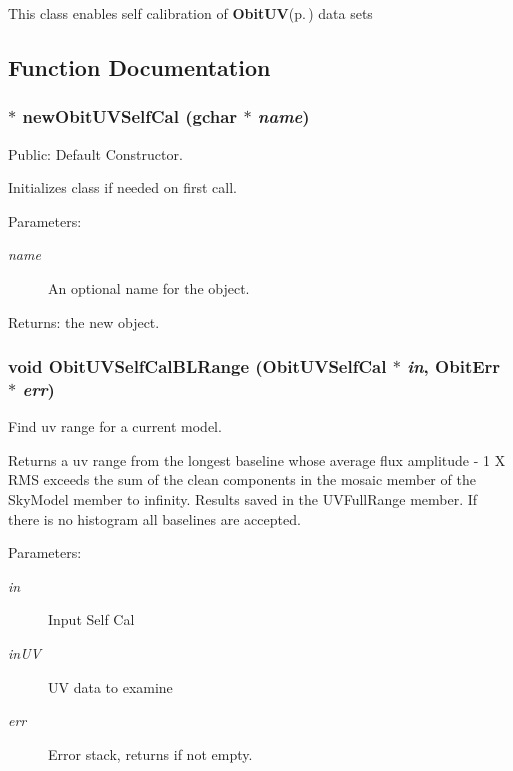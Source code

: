 This class enables self calibration of {\bf Obit\-UV}{\rm (p.\,\pageref{structObitUV})} data sets

\subsection{Function Documentation}
\subsubsection{$\ast$ new\-Obit\-UVSelf\-Cal (gchar $\ast$ {\em name})}\label{ObitUVSelfCal_8c_a6}


Public: Default Constructor. 

Initializes class if needed on first call. \begin{Desc}
\item[Parameters:]
\begin{description}
\item[{\em name}]An optional name for the object. \end{description}
\end{Desc}
\begin{Desc}
\item[Returns:]the new object. \end{Desc}
\subsubsection{\setlength{\rightskip}{0pt plus 5cm}void Obit\-UVSelf\-Cal\-BLRange ({\bf Obit\-UVSelf\-Cal} $\ast$ {\em in}, {\bf Obit\-Err} $\ast$ {\em err})}\label{ObitUVSelfCal_8c_a14}


Find uv range for a current model. 

Returns a uv range from the longest baseline whose average flux amplitude - 1 X RMS exceeds the sum of the clean components in the mosaic member of the Sky\-Model member to infinity. Results saved in the UVFull\-Range member. If there is no histogram all baselines are accepted. \begin{Desc}
\item[Parameters:]
\begin{description}
\item[{\em in}]Input Self Cal \item[{\em in\-UV}]UV data to examine \item[{\em err}]Error stack, returns if not empty. \end{description}
\end{Desc}

